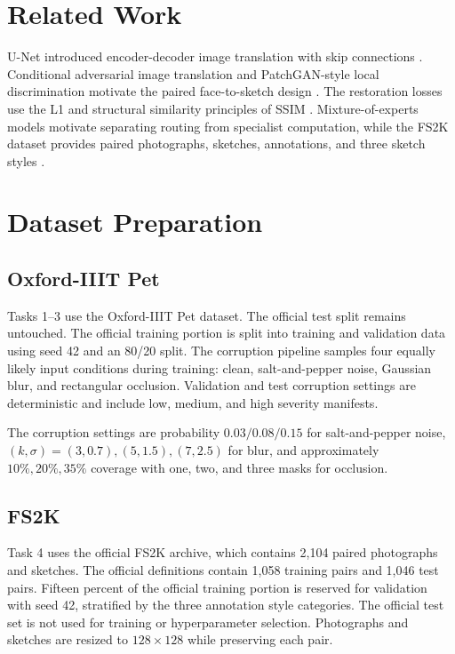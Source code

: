 \documentclass[conference]{IEEEtran}
\begin{document}
\section{Related Work}
U-Net introduced encoder-decoder image translation with skip connections \cite{ronneberger2015unet}. Conditional adversarial image translation and PatchGAN-style local discrimination motivate the paired face-to-sketch design \cite{isola2017pix2pix}. The restoration losses use the L1 and structural similarity principles of SSIM \cite{wang2004ssim}. Mixture-of-experts models motivate separating routing from specialist computation, while the FS2K dataset provides paired photographs, sketches, annotations, and three sketch styles \cite{fan2022fs2k}.

\section{Dataset Preparation}
\subsection{Oxford-IIIT Pet}
Tasks 1--3 use the Oxford-IIIT Pet dataset. The official test split remains untouched. The official training portion is split into training and validation data using seed 42 and an 80/20 split. The corruption pipeline samples four equally likely input conditions during training: clean, salt-and-pepper noise, Gaussian blur, and rectangular occlusion. Validation and test corruption settings are deterministic and include low, medium, and high severity manifests.

The corruption settings are probability $0.03/0.08/0.15$ for salt-and-pepper noise, $(k,\sigma)=(3,0.7),(5,1.5),(7,2.5)$ for blur, and approximately $10\%,20\%,35\%$ coverage with one, two, and three masks for occlusion.

\subsection{FS2K}
Task 4 uses the official FS2K archive, which contains 2,104 paired photographs and sketches. The official definitions contain 1,058 training pairs and 1,046 test pairs. Fifteen percent of the official training portion is reserved for validation with seed 42, stratified by the three annotation style categories. The official test set is not used for training or hyperparameter selection. Photographs and sketches are resized to $128\times128$ while preserving each pair.
\end{document}
